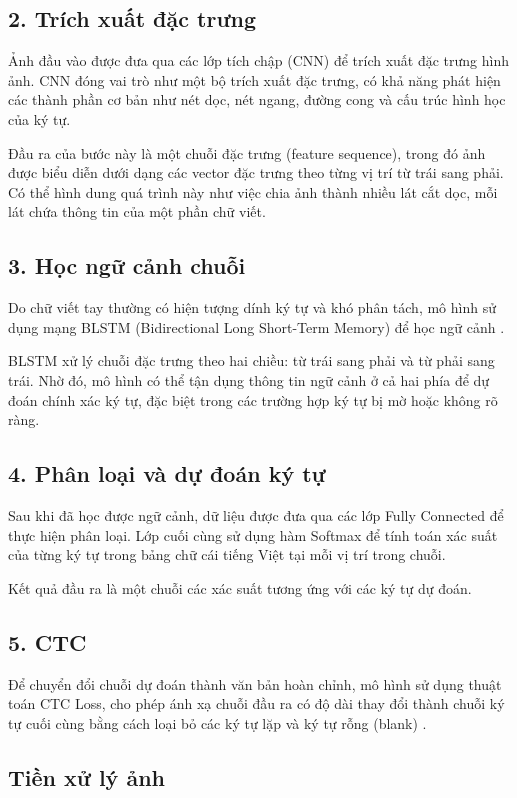 \subsection*{2. Trích xuất đặc trưng}
Ảnh đầu vào được đưa qua các lớp tích chập (CNN) để trích xuất đặc trưng hình ảnh\cite{Reference5,Reference16}. CNN đóng vai trò như một bộ trích xuất đặc trưng, có khả năng phát hiện các thành phần cơ bản như nét dọc, nét ngang, đường cong và cấu trúc hình học của ký tự.

Đầu ra của bước này là một chuỗi đặc trưng (feature sequence), trong đó ảnh được biểu diễn dưới dạng các vector đặc trưng theo từng vị trí từ trái sang phải. Có thể hình dung quá trình này như việc chia ảnh thành nhiều lát cắt dọc, mỗi lát chứa thông tin của một phần chữ viết.

\subsection*{3. Học ngữ cảnh chuỗi}
Do chữ viết tay thường có hiện tượng dính ký tự và khó phân tách, mô hình sử dụng mạng BLSTM (Bidirectional Long Short-Term Memory) để học ngữ cảnh \cite{Reference5,Reference6}.

BLSTM xử lý chuỗi đặc trưng theo hai chiều: từ trái sang phải và từ phải sang trái. Nhờ đó, mô hình có thể tận dụng thông tin ngữ cảnh ở cả hai phía để dự đoán chính xác ký tự, đặc biệt trong các trường hợp ký tự bị mờ hoặc không rõ ràng.

\subsection*{4. Phân loại và dự đoán ký tự}
Sau khi đã học được ngữ cảnh, dữ liệu được đưa qua các lớp Fully Connected để thực hiện phân loại. Lớp cuối cùng sử dụng hàm Softmax để tính toán xác suất của từng ký tự trong bảng chữ cái tiếng Việt tại mỗi vị trí trong chuỗi.

Kết quả đầu ra là một chuỗi các xác suất tương ứng với các ký tự dự đoán.

\subsection*{5. CTC}
Để chuyển đổi chuỗi dự đoán thành văn bản hoàn chỉnh, mô hình sử dụng thuật toán CTC Loss, cho phép ánh xạ chuỗi đầu ra có độ dài thay đổi thành chuỗi ký tự cuối cùng bằng cách loại bỏ các ký tự lặp và ký tự rỗng (blank) \cite{Reference7}.

\subsection{Tiền xử lý ảnh}

